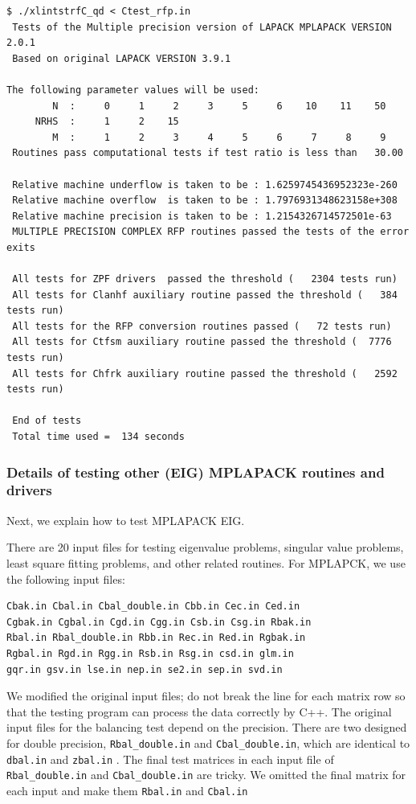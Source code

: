 \documentclass[12pt]{article}
\begin{document}
\begin{verbatim}
$ ./xlintstrfC_qd < Ctest_rfp.in
 Tests of the Multiple precision version of LAPACK MPLAPACK VERSION 2.0.1
 Based on original LAPACK VERSION 3.9.1

The following parameter values will be used:
        N  :     0     1     2     3     5     6    10    11    50
     NRHS  :     1     2    15
        M  :     1     2     3     4     5     6     7     8     9
 Routines pass computational tests if test ratio is less than   30.00

 Relative machine underflow is taken to be : 1.6259745436952323e-260
 Relative machine overflow  is taken to be : 1.7976931348623158e+308
 Relative machine precision is taken to be : 1.2154326714572501e-63
 MULTIPLE PRECISION COMPLEX RFP routines passed the tests of the error exits

 All tests for ZPF drivers  passed the threshold (   2304 tests run)
 All tests for Clanhf auxiliary routine passed the threshold (   384 tests run)
 All tests for the RFP conversion routines passed (   72 tests run)
 All tests for Ctfsm auxiliary routine passed the threshold (  7776 tests run)
 All tests for Chfrk auxiliary routine passed the threshold (   2592 tests run)

 End of tests
 Total time used =  134 seconds
\end{verbatim}
\subsubsection{Details of testing other (EIG) MPLAPACK routines and drivers}
Next, we explain how to test MPLAPACK EIG.

There are 20 input files for testing eigenvalue problems, singular value problems, least square fitting problems,
and other related routines. For MPLAPCK, we use the following input files:
\begin{verbatim}
Cbak.in Cbal.in Cbal_double.in Cbb.in Cec.in Ced.in
Cgbak.in Cgbal.in Cgd.in Cgg.in Csb.in Csg.in Rbak.in
Rbal.in Rbal_double.in Rbb.in Rec.in Red.in Rgbak.in
Rgbal.in Rgd.in Rgg.in Rsb.in Rsg.in csd.in glm.in
gqr.in gsv.in lse.in nep.in se2.in sep.in svd.in
\end{verbatim}
We modified the original input files; do not break the line for each matrix row so that the testing program can process the data correctly by C++.
The original input files for the balancing test depend on the precision. There are two
designed for double precision, {\tt Rbal\_double.in} and {\tt Cbal\_double.in}, which are identical to {\tt dbal.in} and {\tt zbal.in}
. The final test matrices in each input file of {\tt Rbal\_double.in} and {\tt Cbal\_double.in} are tricky. We omitted the final matrix for each input and make them {\tt Rbal.in} and {\tt Cbal.in}
\end{document}
